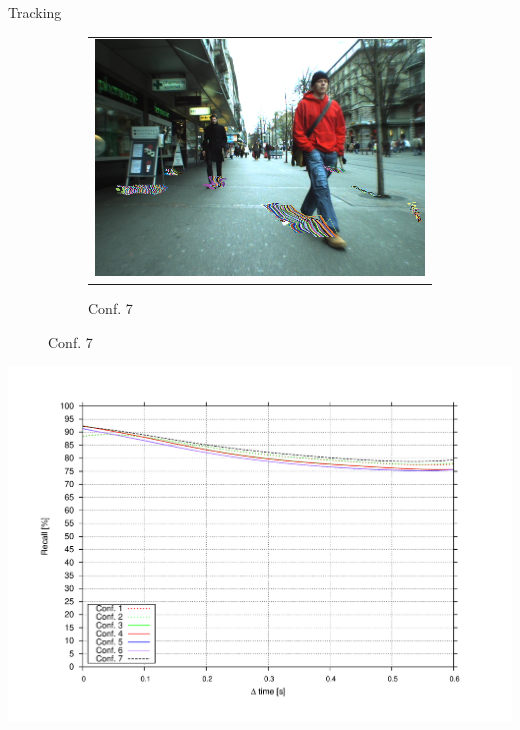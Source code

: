 \begin{frame}[plain]{Tracking}
\begin{center}
{\begin{figure}
        \begin{subfigure}[b]{0.45\textwidth}
	  \begin{tabular}{c}
	    \includegraphics[width=\textwidth]{trackingConf7}
	  \end{tabular}
	  \caption*{Conf. 7}
        \end{subfigure}%
      \end{figure}
    }
     {
      \includegraphics[height=\textheight,trim=50 40 80 60,clip]{recall_vs_step}
    }
  \end{center}
\end{frame}

